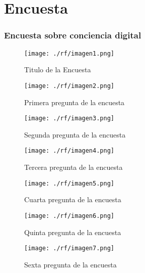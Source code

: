 \chapter{Encuesta}
\subsection{Encuesta sobre conciencia digital}\label{section:ResultEn}

\begin{figure}[H]
    \centering %
        \texttt{[image: ./rf/imagen1.png]} 
    \caption{Titulo de la Encuesta \cite{}}
   \label{figure:Titulo de encuesta}  %
\end{figure}
\begin{figure}[H]
    \centering %
          \texttt{[image: ./rf/imagen2.png]} 
    \caption{Primera pregunta de la encuesta \cite{}}
   \label{figure:Resultado1 12} %
\end{figure}
\begin{figure}[H]
    \centering %
          \texttt{[image: ./rf/imagen3.png]} 
    \caption{Segunda pregunta de la encuesta \cite{}}
   \label{figure:Resultado 113} %
\end{figure}
\begin{figure}[H]
    \centering %
          \texttt{[image: ./rf/imagen4.png]} 
    \caption{Tercera pregunta de la encuesta \cite{}}
   \label{figure:Result1ado 5} %
\end{figure}
\begin{figure}[H]
    \centering %
          \texttt{[image: ./rf/imagen5.png]} 
    \caption{Cuarta pregunta de la encuesta \cite{}}
   \label{figure:Res1ultado 6} %
\end{figure}
\begin{figure}[H]
    \centering %
          \texttt{[image: ./rf/imagen6.png]} 
    \caption{Quinta pregunta de la encuesta \cite{}}
   \label{figure:Resul1tado 7} %
\end{figure}
\begin{figure}[H]
    \centering %
          \texttt{[image: ./rf/imagen7.png]} 
    \caption{Sexta pregunta de la encuesta \cite{}}
   \label{figure:Result1ado 8} %
\end{figure}
